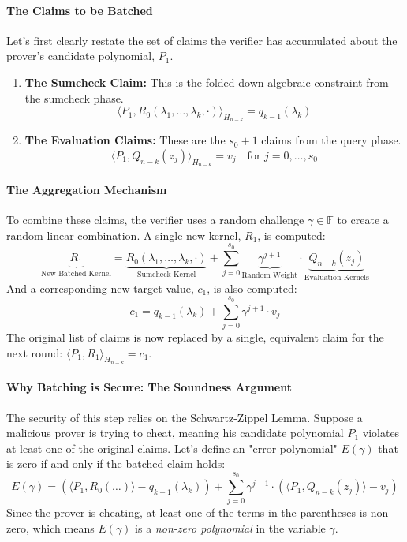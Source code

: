 \documentclass{article}
\begin{document}
\paragraph{The Claims to be Batched}
Let's first clearly restate the set of claims the verifier has accumulated about the prover's candidate polynomial, $P_1$.
\begin{enumerate}
    \item \textbf{The Sumcheck Claim:} This is the folded-down algebraic constraint from the sumcheck phase.
    \[ \langle P_1, R_0(\lambda_1, \dots, \lambda_k, \cdot) \rangle_{H_{n-k}} = q_{k-1}(\lambda_k) \]
    \item \textbf{The Evaluation Claims:} These are the $s_0+1$ claims from the query phase.
    \[ \langle P_1, Q_{n-k}(z_j) \rangle_{H_{n-k}} = v_j \quad \text{for } j=0, \dots, s_0 \]
\end{enumerate}

\paragraph{The Aggregation Mechanism}
To combine these claims, the verifier uses a random challenge $\gamma \in \mathbb{F}$ to create a random linear combination. A single new kernel, $R_1$, is computed:
\[
\underbrace{R_1}_{\text{New Batched Kernel}} = \underbrace{R_0(\lambda_1, \dots, \lambda_k, \cdot)}_{\text{Sumcheck Kernel}} + \sum_{j=0}^{s_0} \underbrace{\gamma^{j+1}}_{\text{Random Weight}} \cdot \underbrace{Q_{n-k}(z_j)}_{\text{Evaluation Kernels}}
\]
And a corresponding new target value, $c_1$, is also computed:
\[
c_1 = q_{k-1}(\lambda_k) + \sum_{j=0}^{s_0} \gamma^{j+1} \cdot v_j
\]
The original list of claims is now replaced by a single, equivalent claim for the next round: $\langle P_1, R_1 \rangle_{H_{n-k}} = c_1$.

\paragraph{Why Batching is Secure: The Soundness Argument}
The security of this step relies on the Schwartz-Zippel Lemma. Suppose a malicious prover is trying to cheat, meaning his candidate polynomial $P_1$ violates at least one of the original claims. Let's define an "error polynomial" $E(\gamma)$ that is zero if and only if the batched claim holds:
\[
E(\gamma) = \left( \langle P_1, R_0(\dots) \rangle - q_{k-1}(\lambda_k) \right) + \sum_{j=0}^{s_0} \gamma^{j+1} \cdot \left( \langle P_1, Q_{n-k}(z_j) \rangle - v_j \right)
\]
Since the prover is cheating, at least one of the terms in the parentheses is non-zero, which means $E(\gamma)$ is a \textit{non-zero polynomial} in the variable $\gamma$.
\end{document}
